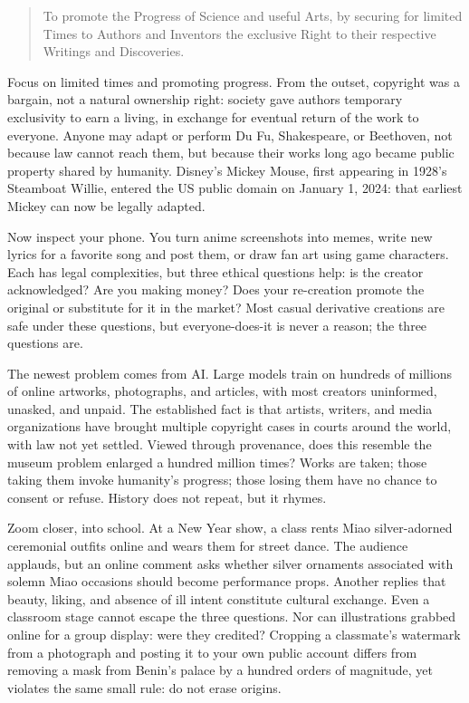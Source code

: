 \begin{quote}
To promote the Progress of Science and useful Arts, by securing for limited Times to Authors and Inventors the exclusive Right to their respective Writings and Discoveries.
\end{quote}
Focus on limited times and promoting progress. From the outset, copyright was a bargain, not a natural ownership right: society gave authors temporary exclusivity to earn a living, in exchange for eventual return of the work to everyone. Anyone may adapt or perform Du Fu, Shakespeare, or Beethoven, not because law cannot reach them, but because their works long ago became public property shared by humanity. Disney's Mickey Mouse, first appearing in 1928's Steamboat Willie, entered the US public domain on January 1, 2024: that earliest Mickey can now be legally adapted.

Now inspect your phone. You turn anime screenshots into memes, write new lyrics for a favorite song and post them, or draw fan art using game characters. Each has legal complexities, but three ethical questions help: is the creator acknowledged? Are you making money? Does your re-creation promote the original or substitute for it in the market? Most casual derivative creations are safe under these questions, but everyone-does-it is never a reason; the three questions are.

The newest problem comes from AI. Large models train on hundreds of millions of online artworks, photographs, and articles, with most creators uninformed, unasked, and unpaid. The established fact is that artists, writers, and media organizations have brought multiple copyright cases in courts around the world, with law not yet settled. Viewed through provenance, does this resemble the museum problem enlarged a hundred million times? Works are taken; those taking them invoke humanity's progress; those losing them have no chance to consent or refuse. History does not repeat, but it rhymes.

Zoom closer, into school. At a New Year show, a class rents Miao silver-adorned ceremonial outfits online and wears them for street dance. The audience applauds, but an online comment asks whether silver ornaments associated with solemn Miao occasions should become performance props. Another replies that beauty, liking, and absence of ill intent constitute cultural exchange. Even a classroom stage cannot escape the three questions. Nor can illustrations grabbed online for a group display: were they credited? Cropping a classmate's watermark from a photograph and posting it to your own public account differs from removing a mask from Benin's palace by a hundred orders of magnitude, yet violates the same small rule: do not erase origins.

